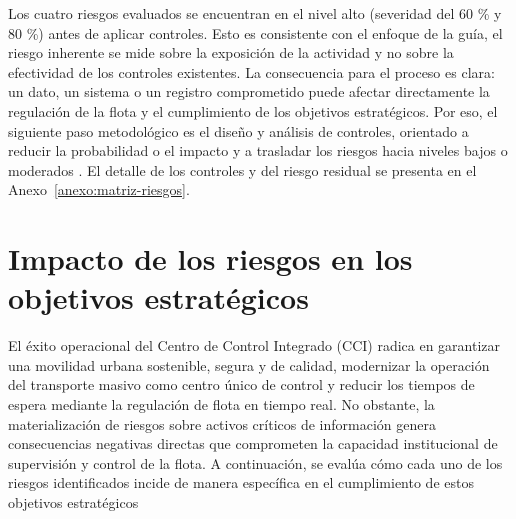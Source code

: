 Los cuatro riesgos evaluados se encuentran en el nivel alto (severidad del 60 \% y 80 \%) antes de aplicar controles. Esto es consistente con el enfoque de la guía, el riesgo inherente se mide sobre la exposición de la actividad y no sobre la efectividad de los controles existentes. La consecuencia para el proceso es clara: un dato, un sistema o un registro comprometido puede afectar directamente la regulación de la flota y el cumplimiento de los objetivos estratégicos. Por eso, el siguiente paso metodológico es el diseño y análisis de controles, orientado a reducir la probabilidad o el impacto y a trasladar los riesgos hacia niveles bajos o moderados \parencite{funcionpublica2025}. El detalle de los controles y del riesgo residual se presenta en el Anexo~\ref{anexo:matriz-riesgos}.

\section{Impacto de los riesgos en los objetivos estratégicos}

El éxito operacional del Centro de Control Integrado (CCI) radica en garantizar una movilidad urbana sostenible, segura y de calidad, modernizar la operación del transporte masivo como centro único de control y reducir los tiempos de espera mediante la regulación de flota en tiempo real. No obstante, la materialización de riesgos sobre activos críticos de información genera consecuencias negativas directas que comprometen la capacidad institucional de supervisión y control de la flota. A continuación, se evalúa cómo cada uno de los riesgos identificados incide de manera específica en el cumplimiento de estos objetivos estratégicos

